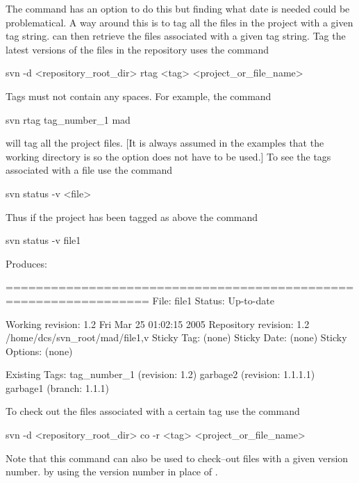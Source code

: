 The  command has an option to do this but finding what date
is needed could be problematical. A way around this is to tag all
the files in the project with a given tag string. \svn can then
retrieve the files associated with a given tag string. Tag the
latest versions of the files in the repository uses the command
\begin{example}
  svn -d <repository_root_dir> rtag <tag> <project_or_file_name>
\end{example}
Tags must not contain any spaces. For example, the command
\begin{example}
  svn rtag tag_number_1 mad
\end{example}
will tag all the  project files. [It is always assumed in the
examples that the working directory is  so the  option
does not have to be used.] To see the tags associated with a file use
the command
\begin{example}
  svn status -v <file>
\end{example}
Thus if the  project has been tagged as above the command
\begin{example}
  svn status -v file1
\end{example}
Produces:
\begin{example}
  =================================================================
  File: file1             Status: Up-to-date
  
     Working revision:    1.2     Fri Mar 25 01:02:15 2005             
     Repository revision: 1.2     /home/dcs/svn_root/mad/file1,v
     Sticky Tag:          (none)
     Sticky Date:         (none)
     Sticky Options:      (none)
  
     Existing Tags:
          tag_number_1                    (revision: 1.2)
          garbage2                        (revision: 1.1.1.1)
          garbage1                        (branch: 1.1.1)
\end{example}

To check out the files associated with a certain tag use the command
\begin{example}
  svn -d <repository_root_dir> co -r <tag> <project_or_file_name>
\end{example}
Note that this command can also be used to check--out files with a
given version number. by using the version number in place of
.

